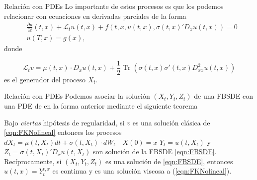 \documentclass[aspectratio=169,xcolor=dvipsnames]{beamer}
\newcommand{\dpartial}[2]{\frac{\partial #1}{\partial #2}}
\DeclareMathOperator{\Tr}{Tr}
\begin{document}
\begin{frame}{Relación con PDEs}
	Lo importante de estos procesos es que los podemos relacionar con ecuaciones en derivadas parciales de la forma
	\begin{equation}
		\label{eqn:FKNolineal}
		\begin{split}
			&\dpartial{u}{t}(t,x)+\mathcal{L}_t u(t,x)+f(t,x,u(t,x),\sigma(t,x)' D_x u(t,x))=0\\
			&u(T,x)=g(x),
		\end{split}
	\end{equation} 
donde 

\begin{equation}
	\label{eqn:ininitesimalGen}
		\mathcal{L}_tv=\mu(t,x)\cdot D_x u(t,x)+\frac{1}{2}\Tr(\sigma(t,x)\sigma'(t,x)D_{xx}^2u(t,x))
\end{equation} 
es el generador del proceso $X_t$.
\end{frame}

\begin{frame}{Relación con PDEs}
	Podemos asociar la solución $(X_t,Y_t,Z_t)$ de una FBSDE con una PDE de en la forma anterior mediante el siguiente teorema
	\begin{theorem}
		Bajo \textit{ciertas} hipótesis de regularidad, si $v$ es una solución clásica de \eqref{eqn:FKNolineal} entonces los procesos $dX_t=\mu(t,X_t)dt+\sigma(t,X_t)\cdot dW_t\quad X(0)=x $ $Y_t=u(t,X_t)$ y $ Z_t=\sigma(t,X_t)' D_x u(t,X_t)$ son solución de la FBSDE \eqref{eqn:FBSDE}.\\
		\vspace*{5mm}
		Recíprocamente, si $(X_t,Y_t,Z_t)$ es una solución de \eqref{eqn:FBSDE}, entonces $u(t,x)=Y^{t,x}_{t}$ es continua y es una solución viscosa a (\ref{eqn:FKNolineal}). 
	\end{theorem}
\end{frame}
	
\end{document}
